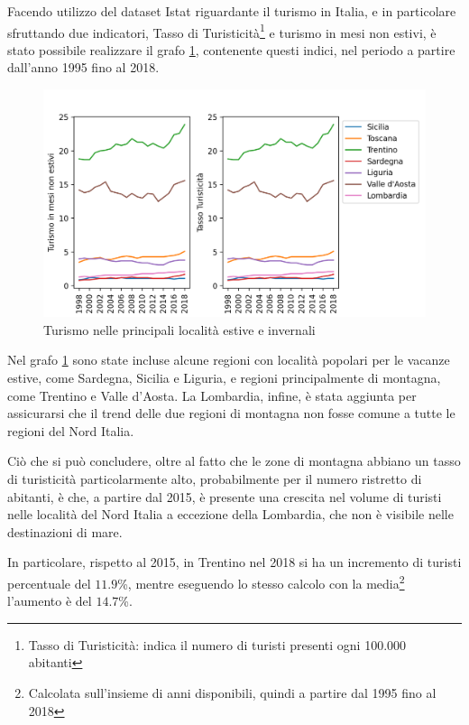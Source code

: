 \documentclass[a4paper,12pt]{report}
\begin{document}
Facendo utilizzo del dataset Istat riguardante il turismo in Italia, e in 
particolare sfruttando due indicatori, Tasso di 
Turisticità\footnote{Tasso di Turisticità: indica il numero di turisti 
presenti ogni 100.000 abitanti\cite{ONTIT:1}} 
e turismo in mesi non estivi, è stato possibile realizzare il grafo \ref{fig:turismo}, 
contenente questi indici, nel periodo a partire dall'anno 1995 fino al 2018.

\begin{figure}
    \includegraphics[width=\linewidth]{../src/turismo/turismo.png}
    \caption{Turismo nelle principali località estive e invernali}
    \label{fig:turismo}
\end{figure}

Nel grafo \ref{fig:turismo} sono state incluse alcune regioni con località popolari 
per le vacanze estive, come Sardegna, Sicilia e Liguria, e regioni principalmente 
di montagna, come Trentino e Valle d'Aosta. 
La Lombardia, infine, è stata aggiunta per assicurarsi che il trend delle due regioni 
di montagna non fosse comune a tutte le regioni del Nord Italia.

Ciò che si può concludere, oltre al fatto che le zone di montagna abbiano 
un tasso di turisticità particolarmente alto, probabilmente per il numero 
ristretto di abitanti, 
è che, a partire dal 2015, è presente una crescita nel volume di turisti nelle località 
del Nord Italia a eccezione della Lombardia, che non è visibile nelle 
destinazioni di mare.

In particolare, rispetto al 2015, in Trentino nel 2018 si ha un incremento 
di turisti percentuale del $11.9$\%, mentre eseguendo lo stesso calcolo con la 
media\footnote{Calcolata sull'insieme di anni disponibili, quindi 
a partire dal 1995 fino al 2018} l'aumento è del $14.7$\%.
\end{document}
